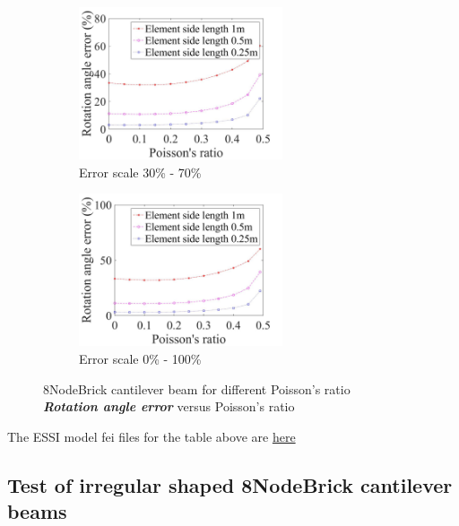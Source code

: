 \documentclass[fleqn,11pt]{article}
\begin{document}
\begin{figure}[H]
  \begin{subfigure}{0.5\textwidth}
    \centering
    \includegraphics[width=6cm]{../Figure-files/error8brick_beam_different_poisson_ratio_angle_div.jpeg}
    \caption{Error scale 30\% - 70\%}
  \end{subfigure}
  \begin{subfigure}{0.5\textwidth}
    \centering
    \includegraphics[width=6cm]{../Figure-files/error8brick_beam_different_poisson_ratio_angle_div100.jpeg}
    \caption{Error scale 0\% - 100\%}
  \end{subfigure}
  \captionsetup{justification=centering,margin=3cm}
  \caption{8NodeBrick cantilever beam for different Poisson's ratio\\
      \emph{\textbf{Rotation angle error}}   versus   Poisson's ratio}
  \label{table angle error 8NodeBrick cantilever beam for different Poisson ratio}
\end{figure}



The ESSI model fei files for the table above are \href{https://github.com/yuan-energy/ESSI_Verification/blob/master/8NodeBrick/cantilever_different_Poisson/cantilever_different_Poisson.tar.gz?raw=true}{here}




\newpage
\subsection{Test of irregular shaped 8NodeBrick cantilever beams}
\end{document}
